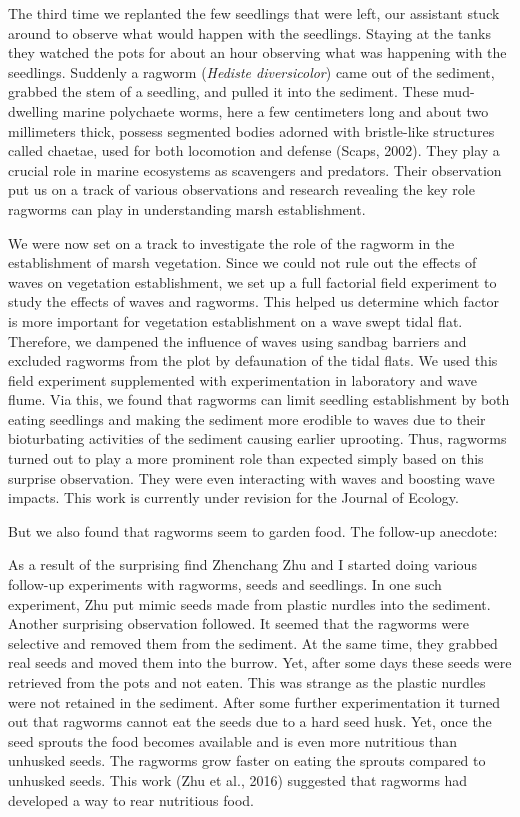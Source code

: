 \documentclass[authordate, anecdote]{jote-new-article}
\begin{document}
	The third time we replanted the few seedlings that were left, our assistant stuck around to observe what would happen with the seedlings. Staying at the tanks they watched the pots for about an hour observing what was happening with the seedlings. Suddenly a ragworm (\emph{Hediste diversicolor}) came out of the sediment, grabbed the stem of a seedling, and pulled it into the sediment. These mud-dwelling marine polychaete worms, here a few centimeters long and about two millimeters thick, possess segmented bodies adorned with bristle-like structures called chaetae, used for both locomotion and defense (Scaps, 2002). They play a crucial role in marine ecosystems as scavengers and predators. Their observation put us on a track of various observations and research revealing the key role ragworms can play in understanding marsh establishment.



	We were now set on a track to investigate the role of the ragworm in the establishment of marsh vegetation. Since we could not rule out the effects of waves on vegetation establishment, we set up a full factorial field experiment to study the effects of waves and ragworms. This helped us determine which factor is more important for vegetation establishment on a wave swept tidal flat. Therefore, we dampened the influence of waves using sandbag barriers and excluded ragworms from the plot by defaunation of the tidal flats. We used this field experiment supplemented with experimentation in laboratory and wave flume. Via this, we found that ragworms can limit seedling establishment by both eating seedlings and making the sediment more erodible to waves due to their bioturbating activities of the sediment causing earlier uprooting. Thus, ragworms turned out to play a more prominent role than expected simply based on this surprise observation. They were even interacting with waves and boosting wave impacts. This work is currently under revision for the Journal of Ecology.



	But we also found that ragworms seem to garden food. The follow-up anecdote:



	As a result of the surprising find Zhenchang Zhu and I started doing various follow-up experiments with ragworms, seeds and seedlings. In one such experiment, Zhu put mimic seeds made from plastic nurdles into the sediment. Another surprising observation followed. It seemed that the ragworms were selective and removed them from the sediment. At the same time, they grabbed real seeds and moved them into the burrow. Yet, after some days these seeds were retrieved from the pots and not eaten. This was strange as the plastic nurdles were not retained in the sediment. After some further experimentation it turned out that ragworms cannot eat the seeds due to a hard seed husk. Yet, once the seed sprouts the food becomes available and is even more nutritious than unhusked seeds. The ragworms grow faster on eating the sprouts compared to unhusked seeds. This work (Zhu et al., 2016) suggested that ragworms had developed a way to rear nutritious food.
\end{document}

